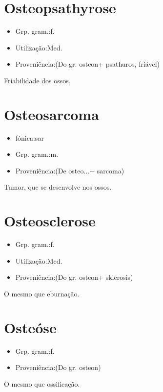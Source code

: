 \section{Osteopsathyrose}
\begin{itemize}
\item {Grp. gram.:f.}
\end{itemize}
\begin{itemize}
\item {Utilização:Med.}
\end{itemize}
\begin{itemize}
\item {Proveniência:(Do gr. \textunderscore osteon\textunderscore  + \textunderscore psathuros\textunderscore , friável)}
\end{itemize}
Fríabilidade dos ossos.
\section{Osteosarcoma}
\begin{itemize}
\item {fónica:sar}
\end{itemize}
\begin{itemize}
\item {Grp. gram.:m.}
\end{itemize}
\begin{itemize}
\item {Proveniência:(De \textunderscore osteo...\textunderscore  + \textunderscore sarcoma\textunderscore )}
\end{itemize}
Tumor, que se desenvolve nos ossos.
\section{Osteosclerose}
\begin{itemize}
\item {Grp. gram.:f.}
\end{itemize}
\begin{itemize}
\item {Utilização:Med.}
\end{itemize}
\begin{itemize}
\item {Proveniência:(Do gr. \textunderscore osteon\textunderscore  + \textunderscore sklerosis\textunderscore )}
\end{itemize}
O mesmo que \textunderscore eburnação\textunderscore .
\section{Osteóse}
\begin{itemize}
\item {Grp. gram.:f.}
\end{itemize}
\begin{itemize}
\item {Proveniência:(Do gr. \textunderscore osteon\textunderscore )}
\end{itemize}
O mesmo que \textunderscore ossificação\textunderscore .
